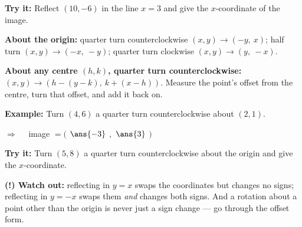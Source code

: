 \documentclass[12pt]{article}
\begin{document}
\begin{tryitbox}
\textbf{Try it:} \quad Reflect $(10, -6)$ in the line $x = 3$ and give the $x$-coordinate of the image.\\[2pt]
\end{tryitbox}


\begin{formulabox}
\textbf{About the origin:} quarter turn counterclockwise $(x, y) \to (-y,\ x)$; half turn $(x, y) \to (-x,\ -y)$; quarter turn clockwise $(x, y) \to (y,\ -x)$.\par
\textbf{About any centre $(h, k)$, quarter turn counterclockwise:} $(x, y) \to (h - (y - k),\ k + (x - h))$. Measure the point's offset from the centre, turn that offset, and add it back on.
\end{formulabox}

\begin{examplebox}
\textbf{Example:} \quad Turn $(4, 6)$ a quarter turn counterclockwise about $(2, 1)$.

$\Rightarrow\quad$ image $= ($ $\ans{-3}$ $,$ $\ans{3}$ $)$
\end{examplebox}

\begin{tryitbox}
\textbf{Try it:} \quad Turn $(5, 8)$ a quarter turn counterclockwise about the origin and give the $x$-coordinate.\\[2pt]
\end{tryitbox}

\begin{watchoutbox}
\textbf{(!) Watch out:} reflecting in $y = x$ swaps the coordinates but changes no signs; reflecting in $y = -x$ swaps them \emph{and} changes both signs. And a rotation about a point other than the origin is never just a sign change --- go through the offset form.
\end{watchoutbox}
\end{document}

